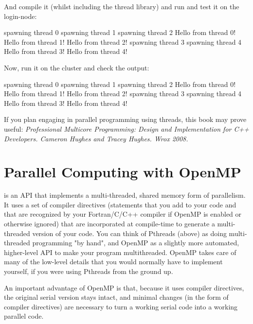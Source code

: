 And compile it (whilst including the thread library) and run and test it on the login-node:

\begin{prompt}
spawning thread 0
spawning thread 1
spawning thread 2
Hello from thread 0!
Hello from thread 1!
Hello from thread 2!
spawning thread 3
spawning thread 4
Hello from thread 3!
Hello from thread 4!
\end{prompt}

Now, run it on the cluster and check the output:

\begin{prompt}
spawning thread 0
spawning thread 1
spawning thread 2
Hello from thread 0!
Hello from thread 1!
Hello from thread 2!
spawning thread 3
spawning thread 4
Hello from thread 3!
Hello from thread 4!
\end{prompt}

 If you plan engaging in parallel programming using threads,
this book may prove useful: \emph{Professional Multicore Programming: Design
and Implementation for C++ Developers. Cameron Hughes and Tracey Hughes. Wrox
2008.}

\section{Parallel Computing with OpenMP}

 is an API that implements a multi-threaded, shared
memory form of parallelism. It uses a set of compiler directives (statements
that you add to your code and that are recognized by your Fortran/C/C++
compiler if OpenMP is enabled or otherwise ignored) that are incorporated at
compile-time to generate a multi-threaded version of your code. You can think
of Pthreads (above) as doing multi-threaded programming "by hand", and OpenMP
as a slightly more automated, higher-level API to make your program
multithreaded. OpenMP takes care of many of the low-level details that you
would normally have to implement yourself, if you were using Pthreads from the
ground up.

An important advantage of OpenMP is that, because it uses compiler directives,
the original serial version stays intact, and minimal changes (in the form of
compiler directives) are necessary to turn a working serial code into a working
parallel code.

